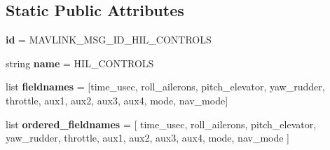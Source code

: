 \subsection*{Static Public Attributes}
\begin{DoxyCompactItemize}
\item 
\mbox{\label{classpymavlink_1_1dialects_1_1v10_1_1MAVLink__hil__controls__message_a64821f9bea5cf9da1711772693ba0314}} 
{\bfseries id} = M\+A\+V\+L\+I\+N\+K\+\_\+\+M\+S\+G\+\_\+\+I\+D\+\_\+\+H\+I\+L\+\_\+\+C\+O\+N\+T\+R\+O\+LS
\item 
\mbox{\label{classpymavlink_1_1dialects_1_1v10_1_1MAVLink__hil__controls__message_a144e07cbe35f94bb5122a7b90dbe8688}} 
string {\bfseries name} = \textquotesingle{}H\+I\+L\+\_\+\+C\+O\+N\+T\+R\+O\+LS\textquotesingle{}
\item 
\mbox{\label{classpymavlink_1_1dialects_1_1v10_1_1MAVLink__hil__controls__message_abcecac3c06c61a4c7fb4ac7e56448161}} 
list {\bfseries fieldnames} = \mbox{[}\textquotesingle{}time\+\_\+usec\textquotesingle{}, \textquotesingle{}roll\+\_\+ailerons\textquotesingle{}, \textquotesingle{}pitch\+\_\+elevator\textquotesingle{}, \textquotesingle{}yaw\+\_\+rudder\textquotesingle{}, \textquotesingle{}throttle\textquotesingle{}, \textquotesingle{}aux1\textquotesingle{}, \textquotesingle{}aux2\textquotesingle{}, \textquotesingle{}aux3\textquotesingle{}, \textquotesingle{}aux4\textquotesingle{}, \textquotesingle{}mode\textquotesingle{}, \textquotesingle{}nav\+\_\+mode\textquotesingle{}\mbox{]}
\item 
\mbox{\label{classpymavlink_1_1dialects_1_1v10_1_1MAVLink__hil__controls__message_a15f90982186a5222294c7c35cd18e52a}} 
list {\bfseries ordered\+\_\+fieldnames} = \mbox{[} \textquotesingle{}time\+\_\+usec\textquotesingle{}, \textquotesingle{}roll\+\_\+ailerons\textquotesingle{}, \textquotesingle{}pitch\+\_\+elevator\textquotesingle{}, \textquotesingle{}yaw\+\_\+rudder\textquotesingle{}, \textquotesingle{}throttle\textquotesingle{}, \textquotesingle{}aux1\textquotesingle{}, \textquotesingle{}aux2\textquotesingle{}, \textquotesingle{}aux3\textquotesingle{}, \textquotesingle{}aux4\textquotesingle{}, \textquotesingle{}mode\textquotesingle{}, \textquotesingle{}nav\+\_\+mode\textquotesingle{} \mbox{]}

\end{DoxyCompactItemize}
